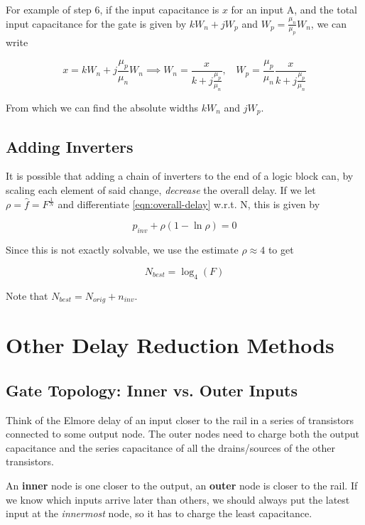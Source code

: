 \documentclass[11pt]{report}
\begin{document}
 For example of step 6, if the input capacitance is $x$ for an input A, and the total input capacitance for the gate is given by $kW_n + jW_p$ and $W_p = \frac{\mu_n}{\mu_p}W_n$, we can write

 $$
 x = kW_n + j\frac{\mu_p}{\mu_n}W_n \implies W_n = \frac{x}{k + j\frac{\mu_p}{\mu_n}}, \ \ \ \ W_p = \frac{\mu_p}{\mu_n}\frac{x}{k + j\frac{\mu_p}{\mu_n}}
 $$

From which we can find the absolute widths $kW_n$ and $jW_p$.

\subsection{Adding Inverters}
It is possible that adding a chain of inverters to the end of a logic block can, by scaling each element of said change, \textit{decrease} the overall delay. If we let $\rho = \hat{f} = F^{\frac{1}{N}}$ and differentiate \autoref{eqn:overall-delay} w.r.t. N, this is given by

\begin{equation}
	p_{inv} + \rho (1 - \ln\rho) = 0
\end{equation}

Since this is not exactly solvable, we use the estimate $\rho \approx 4$ to get

\begin{equation}
	\label{eqn:best-stages}
	N_{best} = \log_4(F)
\end{equation}

Note that $N_{best} = N_{orig} + n_{inv}$.


\section{Other Delay Reduction Methods}
\subsection{Gate Topology: Inner vs. Outer Inputs}\label{sec:inner-outer}
Think of the Elmore delay of an input closer to the rail in a series of transistors connected to some output node. The outer nodes need to charge both the output capacitance and the series capacitance of all the drains/sources of the other transistors.

An \textbf{inner} node is one closer to the output, an \textbf{outer} node is closer to the rail. If we know which inputs arrive later than others, we should always put the latest input at the \textit{innermost} node, so it has to charge the least capacitance.
\end{document}
